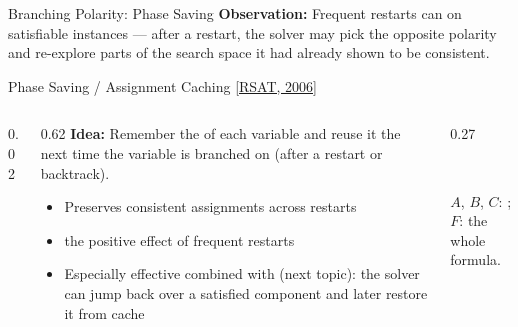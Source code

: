 \documentclass[t]{sdqbeamer}
\begin{document}
\begin{frame}{Branching Polarity: Phase Saving}
\textbf{Observation:} Frequent restarts can  on satisfiable instances --- after a restart, the solver may pick the opposite polarity and re-explore parts of the search space it had already shown to be consistent.\\[1em]
\begin{blueblock}{Phase Saving / Assignment Caching \hfill \href{http://reasoning.cs.ucla.edu/rsat/}{[RSAT, 2006]}}
	\vspace{0.3em}
	\begin{columns}[T]
		\begin{column}{0.02\textwidth}\end{column}
		\begin{column}{0.62\textwidth}
\textbf{Idea:} Remember the  of each variable and reuse it the next time the variable is branched on (after a restart or backtrack).\\[1ex]
\begin{itemize}\setlength{\itemsep}{0.8em}
	\item Preserves consistent assignments across restarts
	\item {} the positive effect of frequent restarts
	\item Especially effective combined with  (next topic): the solver can jump back over a satisfied component and later restore it from cache
\end{itemize}
\end{column}
\begin{column}{0.27\textwidth}
\centering
{}\\[0.8ex]
\begin{flushleft}\footnotesize
$A$, $B$, $C$: ;\\ $F$: the whole formula.\\[0.3ex]

\end{flushleft}
\end{column}
\end{columns}
\end{blueblock}
\end{frame}
\end{document}
